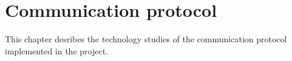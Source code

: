 \chapter{Communication protocol}
This chapter desribes the technology studies of the communication protocol implemented in the project.
